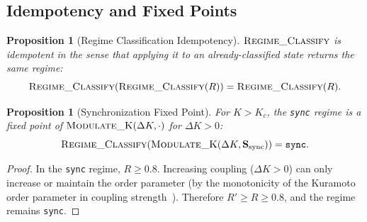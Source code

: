 \documentclass[10pt,twocolumn]{article}
\newtheorem{proposition}[theorem]{Proposition}
\theoremstyle{remark}
\newcommand{\Scoord}{\mathbf{S}}
\begin{document}
\subsection{Idempotency and Fixed Points}

\begin{proposition}[Regime Classification Idempotency]
\label{prop:idempotent}
$\textsc{Regime\_Classify}$ is idempotent in the sense that applying it to an already-classified state returns the same regime:
\begin{equation}
\textsc{Regime\_Classify}(\textsc{Regime\_Classify}(R)) = \textsc{Regime\_Classify}(R).
\end{equation}
\end{proposition}

\begin{proposition}[Synchronization Fixed Point]
\label{prop:sync_fix}
For $K > K_c$, the \texttt{sync} regime is a fixed point of $\textsc{Modulate\_K}(\Delta K, \cdot)$ for $\Delta K > 0$:
\begin{equation}
\textsc{Regime\_Classify}(\textsc{Modulate\_K}(\Delta K, \Scoord_{\mathrm{sync}})) = \texttt{sync}.
\end{equation}
\end{proposition}

\begin{proof}
In the \texttt{sync} regime, $R \geq 0.8$. Increasing coupling ($\Delta K > 0$) can only increase or maintain the order parameter (by the monotonicity of the Kuramoto order parameter in coupling strength~\cite{strogatz2000kuramoto}). Therefore $R' \geq R \geq 0.8$, and the regime remains \texttt{sync}.
\end{proof}
\end{document}
